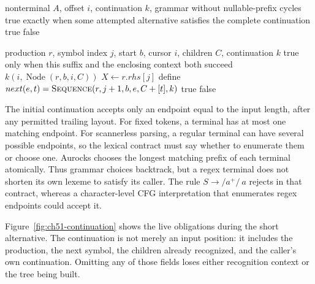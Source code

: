 \begin{algorithm}[htbp]
\caption{Offer every nonterminal alternative to the caller's continuation.}
\label{alg:ch51-choice}
\begin{pseudocode}
\Require nonterminal $A$, offset $i$, continuation $k$, grammar without nullable-prefix cycles
\Ensure true exactly when some attempted alternative satisfies the complete continuation
    \State \Return true
  \EndIf
\EndFor
\State \Return false
\EndFunction
\end{pseudocode}
\end{algorithm}

\begin{algorithm}[htbp]
\caption{Parse a production suffix while retaining the enclosing continuation.}
\label{alg:ch51-sequence}
\begin{pseudocode}
\Require production $r$, symbol index $j$, start $b$, cursor $i$, children $C$, continuation $k$
\Ensure true only when this suffix and the enclosing context both succeed
  \State \Return $k(i,\operatorname{Node}(r,b,i,C))$
\EndIf
\State $X\gets r.rhs[j]$
\State define $next(e,t)=\Call{Sequence}{r,j+1,b,e,C+[t],k}$
  \State \Return {}
\Else
     \State \Return true \EndIf
  \EndFor
  \State \Return false
\EndIf
\EndFunction
\end{pseudocode}
\end{algorithm}

The initial continuation accepts only an endpoint equal to the input length, after any permitted trailing layout.
For fixed tokens, a terminal has at most one matching endpoint.
For scannerless parsing, a regular terminal can have several possible endpoints, so the lexical contract must say whether to enumerate them or choose one.
Aurocks chooses the longest matching prefix of each terminal atomically.
Thus grammar choices backtrack, but a regex terminal does not shorten its own lexeme to satisfy its caller.
The rule $S\to /a^+/\ a$ rejects  in that contract, whereas a character-level CFG interpretation that enumerates regex endpoints could accept it.

Figure~\ref{fig:ch51-continuation} shows the live obligations during the short alternative.
The continuation is not merely an input position: it includes the production, the next symbol, the children already recognized, and the caller's own continuation.
Omitting any of those fields loses either recognition context or the tree being built.


